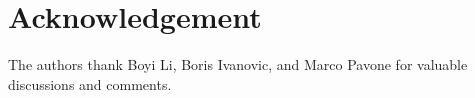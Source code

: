 \section{Acknowledgement}
The authors thank Boyi Li, Boris Ivanovic, and Marco Pavone for valuable discussions and comments.
